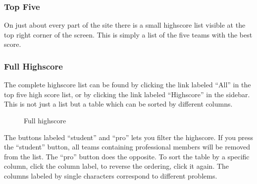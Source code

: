 \subsubsection{Top Five}

On just about every part of the site there is a small highscore list
visible at the top right corner of the screen. This is simply a list of
the five teams with the best score. 

\subsubsection{Full Highscore}

The complete highscore list can be found by clicking the link labeled
{\textquotedblleft}All{\textquotedblright} in the top five high score
list, or by clicking the link labeled
{\textquotedblleft}Highscore{\textquotedblright} in the sidebar. This
is not just a list but a table which can be sorted by different
columns.
\begin{figure}
\centering
	\caption{Full highscore}
	\label{fig:fullHighscore}
\end{figure}

The buttons labeled {\textquotedblleft}student{\textquotedblright} and
{\textquotedblleft}pro{\textquotedblright} lets you filter the
highscore. If you press the
{\textquotedblleft}student{\textquotedblright} button, all teams
containing professional members will be removed from the list. The
{\textquotedblleft}pro{\textquotedblright} button does the opposite. To
sort the table by a specific column, click the column label, to reverse
the ordering, click it again. The columns labeled by single characters
correspond to different problems. 

